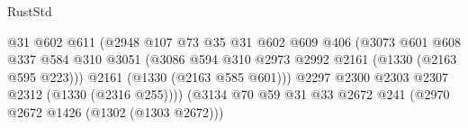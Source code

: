 \begin{lexlean}{RustStd}
\begin{coremodule}
                                                      @31
                                                      @602
                                                      @611
                                                      (@2948
                                                        @107
                                                        @73
                                                        @35
                                                        @31
                                                        @602
                                                        @609
                                                        @406
                                                        (@3073
                                                          @601
                                                          @608
                                                          @337
                                                          @584
                                                          @310
                                                          @3051
                                                          (@3086
                                                            @594
                                                            @310
                                                            @2973
                                                            @2992
                                                            @2161
                                                            (@1330 (@2163 @595 @223)))
                                                          @2161
                                                          (@1330 (@2163 @585 @601)))
                                                        @2297
                                                        @2300
                                                        @2303
                                                        @2307
                                                        @2312
                                                        (@1330 (@2316 @255))))
                                                    (@3134
                                                      @70
                                                      @59
                                                      @31
                                                      @33
                                                      @2672
                                                      @241
                                                      (@2970 @2672 @1426 (@1302 (@1303 @2672)))

\end{coremodule}
\end{lexlean}
